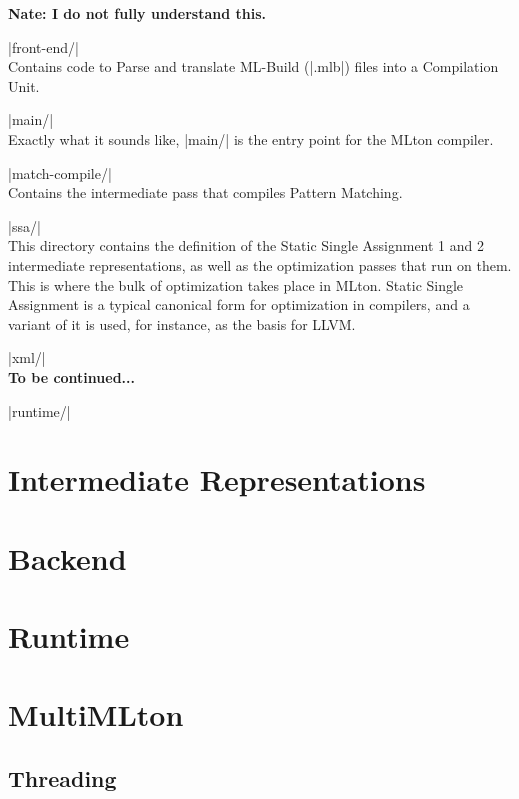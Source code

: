 \documentclass{article}
\begin{document}
\begin{description}
\begin{description}
  \textbf{Nate: I do not fully understand this.}
\item |front-end/| \\
  Contains code to Parse and translate ML-Build (|.mlb|) files into a Compilation Unit.
\item |main/| \\
  Exactly what it sounds like, |main/| is the entry point for the   MLton compiler.
\item |match-compile/| \\
  Contains the intermediate pass that compiles Pattern Matching.
\item |ssa/| \\
  This directory contains the definition of the Static Single Assignment 1 and 2 intermediate representations, as well as the optimization passes that run on them. This is where the bulk of optimization takes place in MLton. Static Single Assignment is a typical canonical form for optimization in compilers, and a variant of it is used, for instance, as the basis for LLVM.
\item |xml/| \\
  \textbf{To be continued...}
\end{description}

\item |runtime/| \\
  

\end{description}

\section{Intermediate Representations}

\section{Backend}

\section{Runtime}



\section{MultiMLton}
\subsection{Threading}
\end{document}
